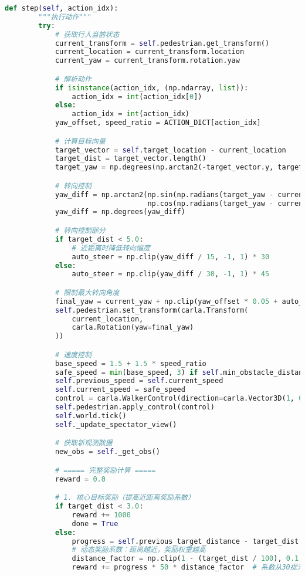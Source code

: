 \begin{lstlisting}[language=Python]
    def step(self, action_idx):
        """执行动作"""
        try:
            # 获取行人当前状态
            current_transform = self.pedestrian.get_transform()
            current_location = current_transform.location
            current_yaw = current_transform.rotation.yaw

            # 解析动作
            if isinstance(action_idx, (np.ndarray, list)):
                action_idx = int(action_idx[0])
            else:
                action_idx = int(action_idx)
            yaw_offset, speed_ratio = ACTION_DICT[action_idx]

            # 计算目标向量
            target_vector = self.target_location - current_location
            target_dist = target_vector.length()
            target_yaw = np.degrees(np.arctan2(-target_vector.y, target_vector.x))

            # 转向控制
            yaw_diff = np.arctan2(np.sin(np.radians(target_yaw - current_yaw)),
                                  np.cos(np.radians(target_yaw - current_yaw)))
            yaw_diff = np.degrees(yaw_diff)

            # 转向控制部分
            if target_dist < 5.0:
                # 近距离时降低转向幅度
                auto_steer = np.clip(yaw_diff / 15, -1, 1) * 30
            else:
                auto_steer = np.clip(yaw_diff / 30, -1, 1) * 45

            # 限制最大转向角度
            final_yaw = current_yaw + np.clip(yaw_offset * 0.05 + auto_steer, -45, 45)
            self.pedestrian.set_transform(carla.Transform(
                current_location,
                carla.Rotation(yaw=final_yaw)
            ))

            # 速度控制
            base_speed = 1.5 + 1.5 * speed_ratio
            safe_speed = min(base_speed, 3) if self.min_obstacle_distance > 2 else 0.8
            self.previous_speed = self.current_speed
            self.current_speed = safe_speed
            control = carla.WalkerControl(direction=carla.Vector3D(1, 0, 0), speed=safe_speed)
            self.pedestrian.apply_control(control)
            self.world.tick()
            self._update_spectator_view()

            # 获取新观测数据
            new_obs = self._get_obs()

            # ===== 完整奖励计算 =====
            reward = 0.0

            # 1. 核心目标奖励（提高近距离奖励系数）
            if target_dist < 3.0:
                reward += 1000
                done = True
            else:
                progress = self.previous_target_distance - target_dist
                # 动态奖励系数：距离越近，奖励权重越高
                distance_factor = np.clip(1 - (target_dist / 100), 0.1, 1.0)
                reward += progress * 50 * distance_factor  # 系数从30提升至50，并加入距离因子


\end{lstlisting}
